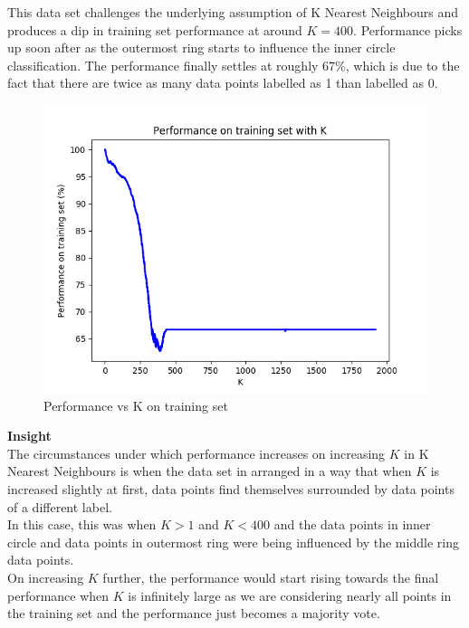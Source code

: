 \documentclass{article}
\begin{document}
This data set challenges the underlying assumption of K Nearest Neighbours and produces a dip in training set performance at around $K=400$. Performance picks up soon after as the outermost ring starts to influence the inner circle classification. The performance finally settles at roughly 67\%, which is due to the fact that there are twice as many data points labelled as 1 than labelled as 0.\\

\begin{figure}[h!]
    \centering
    \includegraphics[scale=1]{performance.png}
    \caption{Performance vs K on training set}
    \label{fig:fig4}
\end{figure}

\textbf{Insight}\\
The circumstances under which performance increases on increasing $K$ in K Nearest Neighbours is when the data set in arranged in a way that when $K$ is increased slightly at first, data points find themselves surrounded by data points of a different label.\\

In this case, this was when $K > 1$ and $K < 400$ and the data points in inner circle and data points in outermost ring were being influenced by the middle ring data points.\\

On increasing $K$ further, the performance would start rising towards the final performance when $K$ is infinitely large as we are considering nearly all points in the training set and the performance just becomes a majority vote.\\
\end{document}
